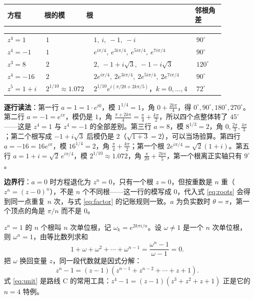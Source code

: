 \documentclass[11pt]{ctexart}
\renewcommand{\thead}[1]{\textbf{\textcolor{violetdeep}{#1}}}
\let\origsubhdr\subhdr
\renewcommand{\subhdr}[1]{\par\needspace{4\baselineskip}\origsubhdr{#1}}
\begin{document}
\begin{minipage}{\linewidth}
\small
\tabtop
\begin{tabular}{@{}p{0.15\linewidth}p{0.17\linewidth}p{0.44\linewidth}p{0.12\linewidth}@{}}
\thead{方程} & \thead{根的模} & \thead{根} & \thead{邻根角差} \\
\end{tabular}
\tabmid
\begin{tabular}{@{}p{0.15\linewidth}p{0.17\linewidth}p{0.44\linewidth}p{0.12\linewidth}@{}}
$z^{4}=1$ & $1$ & $1,\ i,\ -1,\ -i$ & $90^\circ$ \\
$z^{4}=-1$ & $1$ & $e^{i\pi/4},\ e^{3i\pi/4},\ e^{5i\pi/4},\ e^{7i\pi/4}$ & $90^\circ$ \\
$z^{3}=8$ & $2$ & $2,\ -1+i\sqrt3,\ -1-i\sqrt3$ & $120^\circ$ \\
$z^{4}=-16$ & $2$ & $2e^{i\pi/4},\ 2e^{3i\pi/4},\ 2e^{5i\pi/4},\ 2e^{7i\pi/4}$ & $90^\circ$ \\
$z^{5}=1+i$ & $2^{1/10}\approx1.072$ & $2^{1/10}e^{i(\pi/20+2k\pi/5)}$，$k=0,\dots,4$ & $72^\circ$ \\
\end{tabular}
\tabbot
\end{minipage}

\textbf{逐行读法}：第一行 $a=1=1\cdot e^{i0}$，模 $1^{1/4}=1$，角 $0+\frac{2k\pi}{4}$，得 $0^\circ,90^\circ,180^\circ,270^\circ$。第二行 $a=-1=e^{i\pi}$，模仍是 $1$，角 $\frac{\pi+2k\pi}{4}=\frac{\pi}{4}+\frac{k\pi}{2}$，所以四个点整体转了 $45^\circ$——这是 $z^{4}=1$ 与 $z^{4}=-1$ 的全部差别。第三行 $a=8$，模 $8^{1/3}=2$，角 $0,\frac{2\pi}{3},\frac{4\pi}{3}$；第二个根写成 $-1+i\sqrt3$ 后模仍是 $2$（$\sqrt{1+3}=2$），可以当场验算。第四行 $a=-16=16e^{i\pi}$，模 $16^{1/4}=2$，角 $\frac{\pi}{4}+\frac{k\pi}{2}$；第一个根 $2e^{i\pi/4}=\sqrt2(1+i)$。第五行 $a=1+i=\sqrt2\,e^{i\pi/4}$，模 $2^{1/10}\approx1.072$，角 $\frac{\pi}{20}+\frac{2k\pi}{5}$，第一个根离正实轴只有 $9^\circ$。

\textbf{边界行}：$a=0$ 时方程退化为 $z^{n}=0$，只有一个根 $z=0$，但按重数是 $n$ 重（$z^{n}=(z-0)^{n}$），不是 $n$ 个不同根——这一行的模写成 $0$，代入式 \eqref{eq:roots} 会得到同一点重复 $n$ 次，与式 \eqref{eq:factor} 的记账规则一致。$a$ 为负实数时 $\theta=\pi$，第一个顶点的角是 $\pi/n$ 而不是 $0$。


$z^{n}=1$ 的 $n$ 个根叫 $n$ 次单位根，记 $\omega_k=e^{2k\pi i/n}$。设 $\omega\ne1$ 是一个 $n$ 次单位根，则 $\omega^{n}=1$，由等比数列求和
\[ 1+\omega+\omega^{2}+\cdots+\omega^{n-1}
=\frac{\omega^{n}-1}{\omega-1}=0 . \]
把 $\omega$ 换回变量 $z$，同一段代数就是因式分解：
\begin{equation}
z^{n}-1=(z-1)\left(z^{n-1}+z^{n-2}+\cdots+z+1\right).
\label{eq:unit}
\end{equation}
式 \eqref{eq:unit} 是路线 C 的常用工具：$z^{4}-1=(z-1)(z^{3}+z^{2}+z+1)$ 正是它的 $n=4$ 特例。
\end{document}
